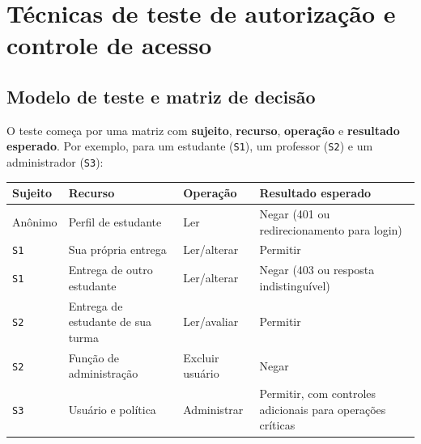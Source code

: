 \section{Técnicas de teste de autorização e controle de
acesso}\label{tuxe9cnicas-de-teste-de-autorizauxe7uxe3o-e-controle-de-acesso}

\subsection{Modelo de teste e matriz de
decisão}\label{modelo-de-teste-e-matriz-de-decisuxe3o}

O teste começa por uma matriz com \textbf{sujeito}, \textbf{recurso},
\textbf{operação} e \textbf{resultado esperado}. Por exemplo, para um
estudante (\texttt{S1}), um professor (\texttt{S2}) e um administrador
(\texttt{S3}):

{\def\LTcaptype{none} %
\begin{longtable}[]{@{}
  >{\raggedright\arraybackslash}p{}
  >{\raggedright\arraybackslash}p{}
  >{\raggedright\arraybackslash}p{}
  >{\raggedright\arraybackslash}p{}@{}}
\toprule\noalign{}
\begin{minipage}[b]{\linewidth}\raggedright
Sujeito
\end{minipage} & \begin{minipage}[b]{\linewidth}\raggedright
Recurso
\end{minipage} & \begin{minipage}[b]{\linewidth}\raggedright
Operação
\end{minipage} & \begin{minipage}[b]{\linewidth}\raggedright
Resultado esperado
\end{minipage} \\
\midrule\noalign{}
\endhead
\bottomrule\noalign{}
\endlastfoot
Anônimo & Perfil de estudante & Ler & Negar (401 ou redirecionamento
para login) \\
\texttt{S1} & Sua própria entrega & Ler/\allowbreak{}alterar & Permitir \\
\texttt{S1} & Entrega de outro estudante & Ler/\allowbreak{}alterar & Negar (403 ou
resposta indistinguível) \\
\texttt{S2} & Entrega de estudante de sua turma & Ler/\allowbreak{}avaliar &
Permitir \\
\texttt{S2} & Função de administração & Excluir usuário & Negar \\
\texttt{S3} & Usuário e política & Administrar & Permitir, com controles
adicionais para operações críticas \\
\end{longtable}
}


